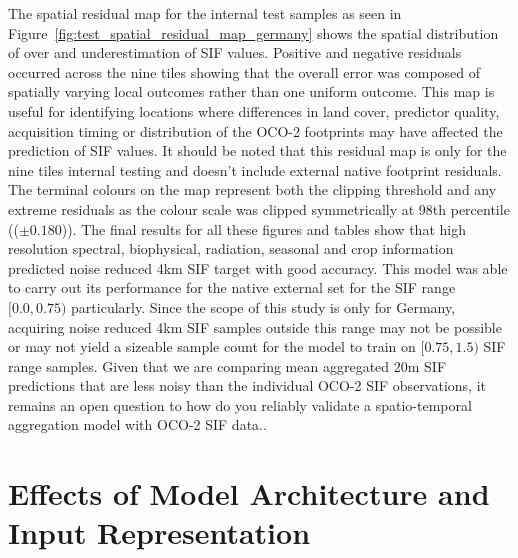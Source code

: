 The spatial residual map for the internal test samples as seen in Figure~\ref{fig:test_spatial_residual_map_germany} shows the spatial distribution of over and underestimation of SIF values. Positive and negative residuals occurred across the nine tiles showing that the overall error was composed of spatially varying local outcomes rather than one uniform outcome. This map is useful for identifying locations where differences in land cover, predictor quality, acquisition timing or distribution of the OCO-2 footprints may have affected the prediction of SIF values. It should be noted that this residual map is only for the nine tiles internal testing and doesn't include external native footprint residuals. The terminal colours on the map represent both the clipping threshold and any extreme residuals as the colour scale was clipped symmetrically at 98th percentile (($\pm 0.180$)). The final results for all these figures and tables show that high resolution spectral, biophysical, radiation, seasonal and crop information predicted noise reduced 4km SIF target with good accuracy. This model was able to carry out its performance for the native external set for the SIF range $[0.0,0.75)$ particularly. Since the scope of this study is only for Germany, acquiring noise reduced 4km SIF samples outside this range may not be possible or may not yield a sizeable sample count for the model to train on $[0.75,1.5)$ SIF range samples. Given that we are comparing mean aggregated 20m SIF predictions that are less noisy \cite{frankenberg2014prospects} than the individual OCO-2 SIF observations, it remains an open question to how do you reliably validate a spatio-temporal aggregation model with OCO-2 SIF data..

\section{Effects of Model Architecture and Input Representation}


